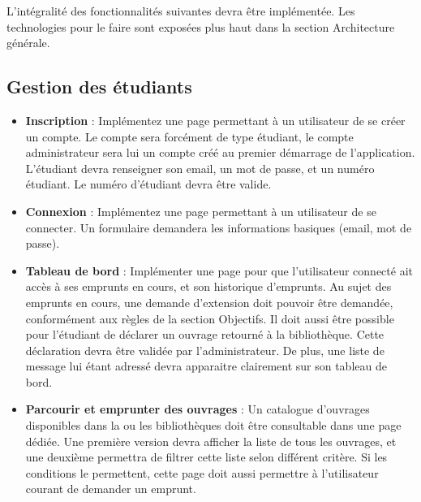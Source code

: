 \documentclass{article}%
\begin{document}
L'intégralité des fonctionnalités suivantes devra être implémentée. Les technologies pour le faire sont exposées plus haut dans la section Architecture générale.

\subsection{Gestion des étudiants}
\begin{itemize}
    \item \textbf{Inscription} : Implémentez une page permettant à un utilisateur de se créer un compte. Le compte sera forcément de type étudiant, le compte administrateur sera lui un compte créé au premier démarrage de l'application. L'étudiant devra renseigner son email, un mot de passe, et un numéro étudiant. Le numéro d'étudiant devra être valide.
    \item \textbf{Connexion} : Implémentez une page permettant à un utilisateur de se connecter. Un formulaire demandera les informations basiques (email, mot de passe). 
    \item \textbf{Tableau de bord} : Implémenter une page pour que l'utilisateur connecté ait accès à ses emprunts en cours, et son historique d'emprunts. Au sujet des emprunts en cours, une demande d'extension doit pouvoir être demandée, conformément aux règles de la section Objectifs. Il doit aussi être possible pour l'étudiant de déclarer un ouvrage retourné à la bibliothèque. Cette déclaration devra être validée par l'administrateur.
    De plus, une liste de message lui étant adressé devra apparaitre clairement sur son tableau de bord. 
    \item \textbf{Parcourir et emprunter des ouvrages} : Un catalogue d'ouvrages disponibles dans la ou les bibliothèques doit être consultable dans une page dédiée. Une première version devra afficher la liste de tous les ouvrages, et une deuxième permettra de filtrer cette liste selon différent critère. Si les conditions le permettent, cette page doit aussi permettre à l'utilisateur courant de demander un emprunt.
\end{itemize}
\end{document}
